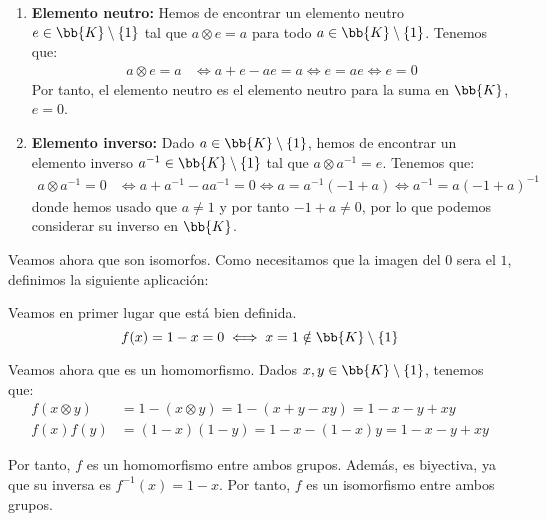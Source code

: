 \begin{ejercicio}
\begin{enumerate}
        \item \textbf{Elemento neutro:} Hemos de encontrar un elemento neutro $e\in \bb{K}\setminus \{1\}$ tal que $a\otimes e=a$ para todo $a\in \bb{K}\setminus \{1\}$. Tenemos que:
        \begin{align*}
            a\otimes e = a &\iff a+e-ae=a\iff e=ae\iff e=0
        \end{align*}
        Por tanto, el elemento neutro es el elemento neutro para la suma en $\bb{K}$, $e=0$.

        \item \textbf{Elemento inverso:} Dado $a\in \bb{K}\setminus \{1\}$, hemos de encontrar un elemento inverso $a^{-1}\in \bb{K}\setminus \{1\}$ tal que $a\otimes a^{-1}=e$. Tenemos que:
        \begin{align*}
            a\otimes a^{-1} = 0 &\iff a+a^{-1}-aa^{-1}=0\iff a=a^{-1}(-1+a)\iff a^{-1}=a(-1+a)^{-1}
        \end{align*}
        donde hemos usado que $a\neq 1$ y por tanto $-1+a\neq 0$, por lo que podemos considerar su inverso en $\bb{K}$.
    \end{enumerate}

    Veamos ahora que son isomorfos. Como necesitamos que la imagen del $0$ sera el $1$,
    definimos la siguiente aplicación:

    Veamos en primer lugar que está bien definida.
    \begin{equation*}
        f(x)=1-x=0\iff x=1\notin \bb{K}\setminus \{1\}
    \end{equation*}

    Veamos ahora que es un homomorfismo. Dados $x,y\in \bb{K}\setminus \{1\}$, tenemos que:
    \begin{align*}
        f(x\otimes y) &= 1-(x\otimes y) = 1-(x+y-xy) = 1-x-y+xy\\
        f(x)f(y) &= (1-x)(1-y) = 1-x-(1-x)y=1-x-y+xy
    \end{align*}

    Por tanto, $f$ es un homomorfismo entre ambos grupos. Además, es biyectiva, ya que su inversa es $f^{-1}(x)=1-x$. Por tanto, $f$ es un isomorfismo entre ambos grupos.
\end{ejercicio}

